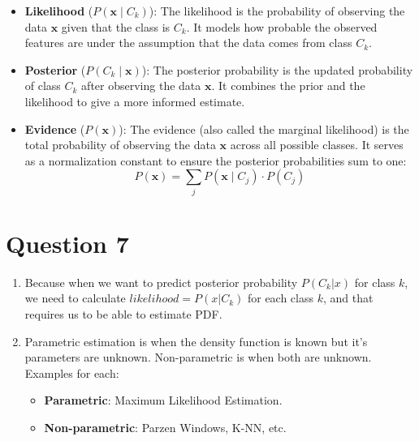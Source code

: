 \documentclass[a4paper,12pt]{article}
\begin{document}
\begin{enumerate}[label=(\alph*)]
\begin{itemize}
        \item \textbf{Likelihood} ($P(\mathbf{x} \mid C_k)$): The likelihood is the probability of observing the data $\mathbf{x}$ given that the class is $C_k$. It models how probable the observed features are under the assumption that the data comes from class $C_k$.

        \item \textbf{Posterior} ($P(C_k \mid \mathbf{x})$): The posterior probability is the updated probability of class $C_k$ after observing the data $\mathbf{x}$. It combines the prior and the likelihood to give a more informed estimate.

        \item \textbf{Evidence} ($P(\mathbf{x})$): The evidence (also called the marginal likelihood) is the total probability of observing the data $\mathbf{x}$ across all possible classes. It serves as a normalization constant to ensure the posterior probabilities sum to one:
        \[
        P(\mathbf{x}) = \sum_{j} P(\mathbf{x} \mid C_j) \cdot P(C_j)
        \]
    \end{itemize}
\end{enumerate}

\section*{Question 7}
\begin{enumerate}[label=(\alph*)]
    \item Because when we want to predict posterior probability $P(C_k|x)$ for class $k$, we need to calculate $likelihood = P(x|C_k)$ for each class $k$, and that requires us to be able to estimate PDF.
    \item Parametric estimation is when the density function is known but it's parameters are unknown. Non-parametric is when both are unknown. Examples for each:
    \begin{itemize}
        \item \textbf{Parametric}: Maximum Likelihood Estimation. 
        \item \textbf{Non-parametric}: Parzen Windows, K-NN, etc.
    \end{itemize}
\end{enumerate}
\end{document}
